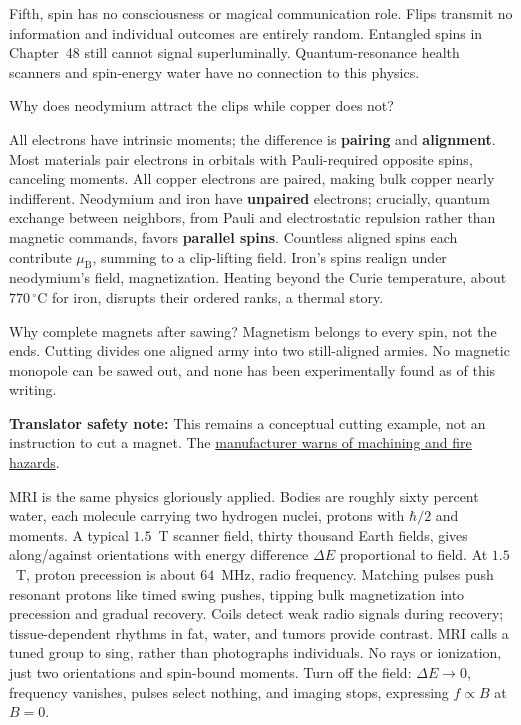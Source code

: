 Fifth, spin has no consciousness or magical communication role. Flips transmit no information and individual outcomes are entirely random. Entangled spins in Chapter~48 still cannot signal superluminally. Quantum-resonance health scanners and spin-energy water have no connection to this physics.


Why does neodymium attract the clips while copper does not?

All electrons have intrinsic moments; the difference is \textbf{pairing} and \textbf{alignment}. Most materials pair electrons in orbitals with Pauli-required opposite spins, canceling moments. All copper electrons are paired, making bulk copper nearly indifferent. Neodymium and iron have \textbf{unpaired} electrons; crucially, quantum exchange between neighbors, from Pauli and electrostatic repulsion rather than magnetic commands, favors \textbf{parallel spins}. Countless aligned spins each contribute $\mu_{\mathrm B}$, summing to a clip-lifting field. Iron's spins realign under neodymium's field, magnetization. Heating beyond the Curie temperature, about $770\,^\circ$C for iron, disrupts their ordered ranks, a thermal story.

Why complete magnets after sawing? Magnetism belongs to every spin, not the ends. Cutting divides one aligned army into two still-aligned armies. No magnetic monopole can be sawed out, and none has been experimentally found as of this writing.

\textbf{Translator safety note:} This remains a conceptual cutting example, not an instruction to cut a magnet. The \href{https://www.kjmagnetics.com/faq.asp}{manufacturer warns of machining and fire hazards}.

MRI is the same physics gloriously applied. Bodies are roughly sixty percent water, each molecule carrying two hydrogen nuclei, protons with $\hbar/2$ and moments. A typical $1.5$~T scanner field, thirty thousand Earth fields, gives along/against orientations with energy difference $\Delta E$ proportional to field. At $1.5$~T, proton precession is about $64$~MHz, radio frequency. Matching pulses push resonant protons like timed swing pushes, tipping bulk magnetization into precession and gradual recovery. Coils detect weak radio signals during recovery; tissue-dependent rhythms in fat, water, and tumors provide contrast. MRI calls a tuned group to sing, rather than photographs individuals. No rays or ionization, just two orientations and spin-bound moments. Turn off the field: $\Delta E\to0$, frequency vanishes, pulses select nothing, and imaging stops, expressing $f\propto B$ at $B=0$.

